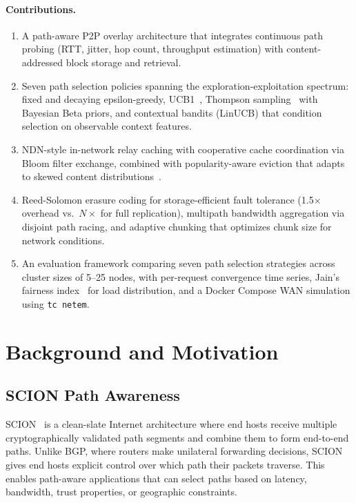 \documentclass[sigconf,nonacm]{acmart}
\begin{document}
\paragraph{Contributions.}
\begin{enumerate}
\item A path-aware P2P overlay architecture that integrates continuous path probing (RTT, jitter, hop count, throughput estimation) with content-addressed block storage and retrieval.

\item Seven path selection policies spanning the exploration-exploitation spectrum: fixed and decaying epsilon-greedy, UCB1~\cite{auer2002bandit}, Thompson sampling~\cite{thompson1933likelihood} with Bayesian Beta priors, and contextual bandits (LinUCB) that condition selection on observable context features.

\item NDN-style in-network relay caching with cooperative cache coordination via Bloom filter exchange, combined with popularity-aware eviction that adapts to skewed content distributions~\cite{kangasharju2002caching}.

\item Reed-Solomon erasure coding for storage-efficient fault tolerance (1.5$\times$ overhead vs.\ $N\times$ for full replication), multipath bandwidth aggregation via disjoint path racing, and adaptive chunking that optimizes chunk size for network conditions.

\item An evaluation framework comparing seven path selection strategies across cluster sizes of 5--25 nodes, with per-request convergence time series, Jain's fairness index~\cite{jain1984quantitative} for load distribution, and a Docker Compose WAN simulation using \texttt{tc netem}.
\end{enumerate}

\section{Background and Motivation}
\label{sec:background}

\subsection{SCION Path Awareness}

SCION~\cite{perrig2017scion} is a clean-slate Internet architecture where end hosts receive multiple cryptographically validated path segments and combine them to form end-to-end paths. Unlike BGP, where routers make unilateral forwarding decisions, SCION gives end hosts explicit control over which path their packets traverse. This enables path-aware applications that can select paths based on latency, bandwidth, trust properties, or geographic constraints.
\end{document}
